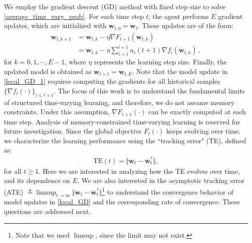 \documentclass[conference]{IEEEtran}
\newcommand{\egl}[1]{{\color{blue}\bf{[EGL: #1]}}}
\newcommand{\fraz}[1]{\textcolor{purple}{\bf [Fraz: #1]}}
\newcommand{\nm}[1]{\textcolor{magenta}{\bf [NM: #1]}}
\begin{document}
We employ the gradient descent (GD) method with fixed step size to solve \eqref{average_time_vary_prob}. For each time step $t$, the agent performs $E$ gradient updates, which are initialized with $\mathbf{w}_{t,0} = \mathbf{w}_{t}$. These updates are of the form:
\begin{align}
\label{local_GD}
\mathbf{w}_{t,k+1} &= 
\mathbf{w}_{t,k} - \eta \nabla F_{t+1}(\mathbf{w}_{t,k}) \\&
=\mathbf{w}_{t,k} - \eta \sum_{i=1}^{t+1} a_i(t+1) \nabla f_i(\mathbf{w}_{t,k})\,, \label{local_GD_1}
\end{align}
for $k = 0,1,\cdots,E-1$, where $\eta$ represents the learning step size. Finally, the updated model is obtained as $\mathbf{w}_{t+1} = \mathbf{w}_{t,E}$.
Note that the model update in \eqref{local_GD_1} requires computing the gradients for all historical samples $\{\nabla f_i(\cdot)\}_{i \leq t+1}$. The focus of this work is to understand the fundamental limits of structured time-varying learning, and therefore, we do not assume memory constraints. Under this assumption, $\nabla F_{t+1}(\cdot)$ can be exactly computed at each time step. Analysis of memory-constrained time-varying learning is reserved for future investigation.
Since the global objective $F_t(\cdot)$ keeps evolving over time, we characterize the learning performance using the ``tracking error" (TE), defined as:
\begin{align}
    \text{TE}(t) =  \Vert \mathbf{w}_t - \overline{\mathbf{w}}^*_t  \Vert, 
\end{align}
for all $t \geq 1$. Here we are interested in analyzing how the TE evolves over time, and its dependence on $E$. 
We are also interested in the asymptotic tracking error (ATE) $\triangleq \limsup_{t \to \infty} \Vert \mathbf{w}_t - \overline{\mathbf{w}}^*_t  \Vert$\footnote{Note that we used $\limsup$, since the limit may not exist.} to understand the convergence behavior of model updates in \eqref{local_GD} and the corresponding rate of convergence. These questions are addressed next.
\end{document}
